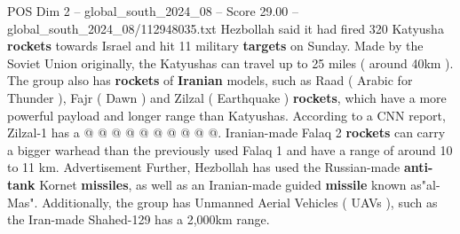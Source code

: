 \begin{textsample}{POS Dim 2 – global\_south\_2024\_08 – Score 29.00 – global\_south\_2024\_08/112948035.txt}
Hezbollah said it had fired 320 Katyusha \textbf{rockets} towards Israel and hit 11 military \textbf{targets} on Sunday.
Made by the Soviet Union originally, the Katyushas can travel up to 25 miles ( around 40km ).
The group also has \textbf{rockets} of \textbf{Iranian} models, such as Raad ( Arabic for Thunder ), Fajr ( Dawn ) and Zilzal ( Earthquake ) \textbf{rockets}, which have a more powerful payload and longer range than Katyushas.
According to a CNN report, Zilzal-1 has a @ @ @ @ @ @ @ @ @ @.
Iranian-made Falaq 2 \textbf{rockets} can carry a bigger warhead than the previously used Falaq 1 and have a range of around 10 to 11 km.
Advertisement Further, Hezbollah has used the Russian-made \textbf{anti-tank} Kornet \textbf{missiles}, as well as an Iranian-made guided \textbf{missile} known as"al-Mas".
Additionally, the group has Unmanned Aerial Vehicles ( UAVs ), such as the Iran-made Shahed-129 has a 2,000km range.

\end{textsample}
